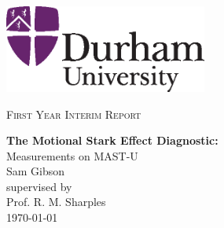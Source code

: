 %

\newpage
	\begin{center}
	\includegraphics[width=0.5\textwidth]{DU_2-col_sml.eps}\par\vspace{1cm} %
	{\scshape\Large First Year Interim Report\par} %
	
	{\scshape \par} %
	\vspace{1cm}
	{\huge\bfseries The Motional Stark Effect Diagnostic:\\} %
	\vspace{0.25cm}
	{\Large Measurements on MAST-U\\} %
	\vspace{0.75cm}
	{\Large Sam Gibson\\} %
	\vspace{0.25cm}
	supervised by\\
	Prof. R. M. Sharples\\ %
	\vspace{0.5cm}
	{\large \today}\\ %
	\vspace{1cm}
    \end{center}

